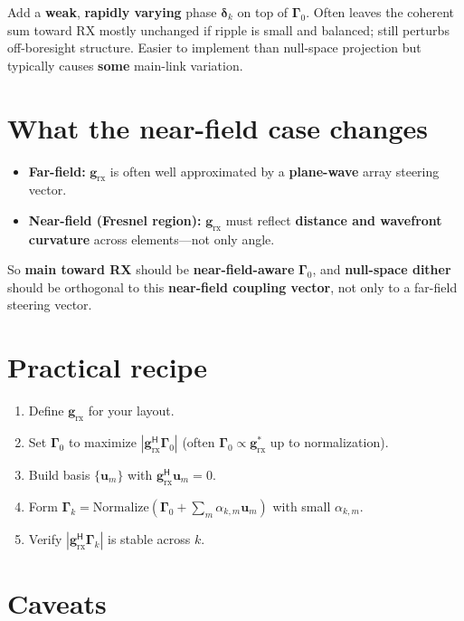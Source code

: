 \documentclass[11pt,a4paper]{article}
\newcommand{\rx}{\mathrm{rx}}
\begin{document}
Add a \textbf{weak}, \textbf{rapidly varying} phase $\bm{\delta}_k$ on top of $\bm{\Gamma}_0$. Often leaves the coherent sum toward RX mostly unchanged if ripple is small and balanced; still perturbs off-boresight structure. Easier to implement than null-space projection but typically causes \textbf{some} main-link variation.

\section{What the near-field case changes}

\begin{itemize}
\item \textbf{Far-field:} $\mathbf{g}_{\rx}$ is often well approximated by a \textbf{plane-wave} array steering vector.
\item \textbf{Near-field (Fresnel region):} $\mathbf{g}_{\rx}$ must reflect \textbf{distance and wavefront curvature} across elements---not only angle.
\end{itemize}

So \textbf{main toward RX} should be \textbf{near-field-aware} $\bm{\Gamma}_0$, and \textbf{null-space dither} should be orthogonal to this \textbf{near-field coupling vector}, not only to a far-field steering vector.

\section{Practical recipe}

\begin{enumerate}
\item Define $\mathbf{g}_{\rx}$ for your layout.
\item Set $\bm{\Gamma}_0$ to maximize $|\mathbf{g}_{\rx}^{\mathsf{H}} \bm{\Gamma}_0|$ (often $\bm{\Gamma}_0 \propto \mathbf{g}_{\rx}^{*}$ up to normalization).
\item Build basis $\{\mathbf{u}_m\}$ with $\mathbf{g}_{\rx}^{\mathsf{H}} \mathbf{u}_m = 0$.
\item Form $\bm{\Gamma}_k = \mathrm{Normalize}(\bm{\Gamma}_0 + \sum_m \alpha_{k,m} \mathbf{u}_m)$ with small $\alpha_{k,m}$.
\item Verify $|\mathbf{g}_{\rx}^{\mathsf{H}} \bm{\Gamma}_k|$ is stable across $k$.
\end{enumerate}

\section{Caveats}
\end{document}
